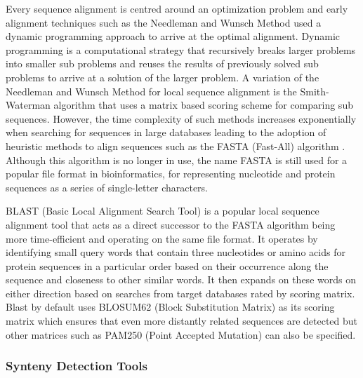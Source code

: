 Every sequence alignment is centred around an optimization problem and early alignment techniques such as the Needleman and Wunsch Method \cite{needleman1970general} used a dynamic programming approach to arrive at the optimal alignment. Dynamic programming is a computational strategy that recursively breaks larger problems into smaller sub problems and reuses the results of previously solved sub problems to arrive at a solution of the larger problem. A variation of the Needleman and Wunsch Method for local sequence alignment is the Smith-Waterman algorithm\cite{smith1981identification} that uses a matrix based scoring scheme for comparing sub sequences.
However, the time complexity of such methods increases exponentially when searching for sequences in large databases leading to the adoption of heuristic methods to align sequences such as the FASTA (Fast-All) algorithm \cite{lipman1985rapid}. Although this algorithm is no longer in use, the name FASTA is still used for a popular file format in bioinformatics, for representing nucleotide and protein sequences as a series of single-letter characters.

BLAST (Basic Local Alignment Search Tool) is a popular local sequence alignment tool that acts as a direct successor to the FASTA algorithm being more time-efficient and operating on the same file format\cite{pertsemlidis2001having}. It operates by identifying small query words that contain three nucleotides or amino acids for protein sequences in a particular order based on their occurrence along the sequence and closeness to other similar words. It then expands on these words on either direction based on searches from target databases rated by scoring matrix. Blast by default uses BLOSUM62 (Block Substitution Matrix) as its scoring matrix which ensures that even more distantly related sequences are detected but other matrices such as PAM250 (Point Accepted Mutation) can also be specified.



\subsubsection{Synteny Detection Tools}

